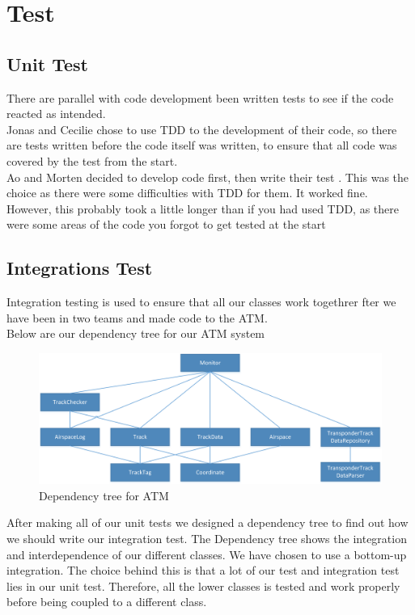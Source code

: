 	\section{Test}
	
	\subsection{Unit Test}
	There are parallel with code development been written tests to see if the code reacted as intended. \\
	
	\noindent Jonas and Cecilie chose to use TDD to the development of their code, so there are tests written before the code itself was written, to ensure that all code was covered by the test from the start. \\
	
	\noindent Ao and Morten decided to develop code first, then write their test . This was the choice as there were some difficulties with TDD for them. It worked fine. However, this probably took a little longer than if you had used TDD, as there were some areas of the code you forgot to get tested at the start \\
	
	
	\subsection{Integrations Test}
	Integration testing is used to ensure that all our classes work togethrer fter we have been in two teams and made code to the ATM.\\
	Below are our dependency tree for our ATM system
	\begin{figure}
		\centering
		\includegraphics[width=1.0\linewidth]{"Images/Dependencytree"}
		\caption{Dependency tree for ATM}
		\label{fig:Dependencytree}
	\end{figure}
	
	\pagebreak
	
	\noindent After making all of our unit tests we designed a dependency tree to find out how we should write our integration test. The Dependency tree shows the integration and interdependence of our different classes. We have chosen to use a bottom-up integration. The choice behind this is that a lot of our test and integration test lies in our unit test. Therefore, all the lower classes is tested and work properly before being coupled to a different class.
	
